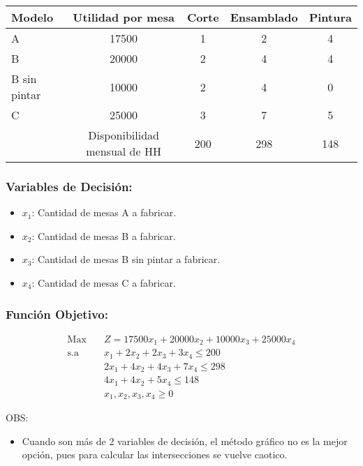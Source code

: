 \documentclass{templateNote}
\begin{document}
\begin{center}
    \begin{tabular}{|l|c|c|c|c|}
        \hline
        Modelo & Utilidad por mesa & Corte & Ensamblado & Pintura \\ \hline
        A & 17500 & 1 & 2 & 4 \\ \hline
        B & 20000 & 2 & 4 & 4 \\ \hline
        B sin pintar & 10000 & 2 & 4 & 0 \\ \hline
        C & 25000 & 3 & 7 & 5 \\ \hline
         & Disponibilidad mensual de HH & 200 & 298 & 148 \\ \hline
    \end{tabular}
\end{center}

\subsubsection*{Variables de Decisión:}
\begin{itemize}
    \item $x_1$: Cantidad de mesas A a fabricar.
    \item $x_2$: Cantidad de mesas B a fabricar.
    \item $x_3$: Cantidad de mesas B sin pintar a fabricar.
    \item $x_4$: Cantidad de mesas C a fabricar.
\end{itemize}

\subsubsection*{Función Objetivo:}
\begin{equation*}
    \begin{aligned}
        \text{Max} \quad & Z = 17500x_1 + 20000x_2 + 10000x_3 + 25000x_4 \\
        \text{s.a} \quad & x_1 + 2x_2 + 2x_3 + 3x_4 \leq 200 \\
        & 2x_1 + 4x_2 + 4x_3 + 7x_4 \leq 298 \\
        & 4x_1 + 4x_2 + 5x_4 \leq 148 \\
        & x_1, x_2, x_3, x_4 \geq 0
    \end{aligned}
\end{equation*}

OBS:
\begin{itemize}
    \item Cuando son más de 2 variables de decisión, el método gráfico no es la mejor opción, pues para calcular las intersecciones se vuelve caotico.
\end{itemize}
\end{document}
